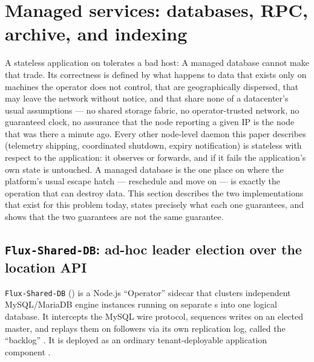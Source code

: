 \section{Managed services: databases, RPC, archive, and indexing}
\label{sec:managed-services}

A stateless application on \Flux tolerates a bad host:  A managed
database cannot make that trade. Its correctness is defined by what happens to data
that exists only on machines the operator does not control, that are geographically
dispersed, that may leave the network without notice, and that share none of a
datacenter's usual assumptions --- no shared storage fabric, no operator-trusted
network, no guaranteed clock, no assurance that the node reporting a given IP is the
node that was there a minute ago. Every other node-level daemon this paper describes
(telemetry shipping, coordinated shutdown, expiry notification) is stateless with
respect to the application: it observes or forwards, and if it fails the application's
own state is untouched. A managed database is the one place on \Flux where the
platform's usual escape hatch --- reschedule and move on --- is exactly the operation
that can destroy data. This section describes the two implementations that exist for
this problem today, states precisely what each one guarantees, and shows that the two
guarantees are not the same guarantee.

\subsection{\texttt{Flux-Shared-DB}: ad-hoc leader election over the \FluxOS location API}
\label{subsec:flux-shared-db}

\texttt{Flux-Shared-DB} (\shipped) is a Node.js ``Operator'' sidecar that clusters
independent MySQL/MariaDB engine instances running on separate \FluxNode s into one
logical database. It intercepts the MySQL wire protocol, sequences writes on an
elected master, and replays them on followers via its own replication log, called the
``backlog'' . It is deployed as an ordinary
tenant-deployable \FluxOS application component .

